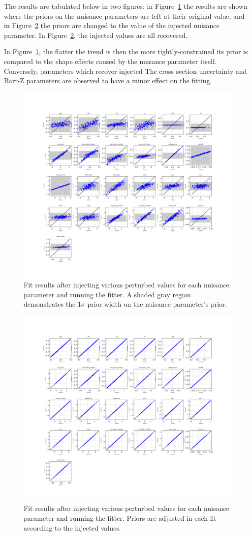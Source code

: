 \documentclass[main.tex]{subfiles}
\begin{document}
The results are tabulated below in two figures: in Figure~\ref{fig:ir_nopriorpert} the results are shown where the priors on the nuisance parameters are left at their original value, and in Figure~\ref{fig:ir_priorpert} the priors are changed to the value of the injected nuisance parameter. 
In Figure~\ref{fig:ir_priorpert}, the injected values are all recovered. 

In Figure~\ref{fig:ir_nopriorpert}, the flatter the trend is then the more tightly-constrained its prior is compared to the shape effects caused by the nuisance parameter itself. 
Conversely, parameters which recover injected
The cross section uncertainty and Barr-Z parameters are observed to have a minor effect on the fitting. 

\begin{figure}
    \centering 
    \includegraphics[width=0.7\linewidth]{figures/syst_ir_shuffle_nofix.png}
    \caption{Fit results after injecting various perturbed values for each nuisance parameter and running the fitter. A shaded gray region demonstrates the $1\sigma$ prior width on the nuisance parameter's prior.}\label{fig:ir_nopriorpert}
\end{figure}


\begin{figure}
    \centering 
    \includegraphics[width=0.7\linewidth]{figures/update_inject_recover_syst_prior.png}
    \caption{Fit results after injecting various perturbed values for each nuisance parameter and running the fitter. Priors are adjusted in each fit according to the injected values.}\label{fig:ir_priorpert}
\end{figure}
\end{document}
